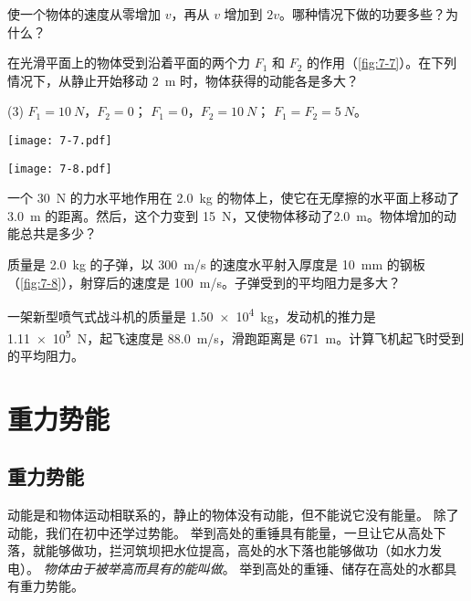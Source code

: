 \begin{Practice}
\begin{question}
  \item 使一个物体的速度从零增加 $v$，再从 $v$ 增加到 $2v$。哪种情况下做的功要多些？为什么？
  \item 在光滑平面上的物体受到沿着平面的两个力 $F_1$ 和 $F_2$ 的作用（\cref{fig:7-7}）。在下列情况下，从静止开始移动 \qty{2}{m} 时，物体获得的动能各是多大？
  \begin{tasks}(3)
    \task $F_1=\qty{10}{N}$，$F_2=0$；
    \task $F_1=0$，$F_2=\qty{10}{N}$；
    \task $F_1=F_2=\qty{5}{N}$。
  \end{tasks}
  \begin{figurehere}
    \begin{minipage}[b]{0.48\linewidth}
      \centering
      \texttt{[image: 7-7.pdf]}
      \caption{}\label{fig:7-7}
    \end{minipage}
    \begin{minipage}[b]{0.48\linewidth}
      \centering
      \texttt{[image: 7-8.pdf]}
      \caption{}\label{fig:7-8}
    \end{minipage}
  \end{figurehere}
  \item 一个 \qty{30}{N} 的力水平地作用在 \qty{2.0}{kg} 的物体上，使它在无摩擦的水平面上移动了 \qty{3.0}{m} 的距离。然后，这个力变到 \qty{15}{N}，又使物体移动了\qty{2.0}{m}。物体增加的动能总共是多少？
  \item 质量是 \qty{2.0}{kg} 的子弹，以 \qty{300}{m/s} 的速度水平射入厚度是 \qty{10}{mm} 的钢板（\cref{fig:7-8}），射穿后的速度是 \qty{100}{m/s}。子弹受到的平均阻力是多大？

  \item 一架新型喷气式战斗机的质量是 \qty{1.50e4}{kg}，发动机的推力是 \qty{1.11e5}{N}，起飞速度是 \qty{88.0}{m/s}，滑跑距离是 \qty{671}{m}。计算飞机起飞时受到的平均阻力。
\end{question}
\end{Practice}

\section{重力势能}
\subsection{重力势能}
动能是和物体运动相联系的，静止的物体没有动能，但不能说它没有能量。
除了动能，我们在初中还学过势能。
举到高处的重锤具有能量，一旦让它从高处下落，就能够做功，拦河筑坝把水位提高，高处的水下落也能够做功（如水力发电）。
\emph{物体由于被举高而具有的能叫做}。
举到高处的重锤、储存在高处的水都具有重力势能。

